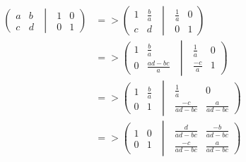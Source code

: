 \documentclass[20pt]{article}
\begin{document}
\begin{text}
    \begin{align}
        \left(
        \begin{matrix}
            a & b\\
            c & d
        \end{matrix}
        \,\, \middle\vert \,\,
        \begin{matrix}
            1 & 0\\
            0 & 1
        \end{matrix}
        \right) 
        &=>
        \left(
        \begin{matrix}
            1 & \frac{b}{a}\\
            c & d
        \end{matrix}
        \,\, \middle\vert \,\,
        \begin{matrix}
            \frac{1}{a} & 0\\
            0 & 1
        \end{matrix}
        \right)\nonumber\\
        &=>
        \left(
        \begin{matrix}
            1 & \frac{b}{a}\\
            0 & \frac{ad - bc}{a}
        \end{matrix}
        \,\, \middle\vert \,\,
        \begin{matrix}
            \frac{1}{a} & 0\\
            \frac{-c}{a} & 1
        \end{matrix}
        \right)\nonumber\\
        &=>
        \left(
        \begin{matrix}
            1 & \frac{b}{a}\\
            0 & 1
        \end{matrix}
        \,\, \middle\vert \,\,
        \begin{matrix}
            \frac{1}{a} & 0\\
            \frac{-c}{ad-bc} & \frac{a}{ad-bc}
        \end{matrix}
        \right)\nonumber\\
        &=>
        \left(
        \begin{matrix}
            1 & 0\\
            0 & 1
        \end{matrix}
        \,\, \middle\vert \,\,
        \begin{matrix}
            \frac{d}{ad-bc} & \frac{-b}{ad-bc}\\
            \frac{-c}{ad-bc} & \frac{a}{ad-bc}
        \end{matrix}
        \right)\nonumber
    \end{align}
    

\end{text}
\end{document}
